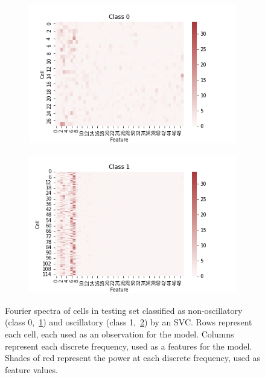 \begin{figure}
  \centering
  \begin{subfigure}[htpb]{0.7\textwidth}
   \centering
   \includegraphics[width=\textwidth]{fft_testing_featurevector_0}
   \caption{
   }
   \label{fig:analysis-svc-fft-0}
  \end{subfigure}

  \begin{subfigure}[htpb]{0.7\textwidth}
   \centering
   \includegraphics[width=\textwidth]{fft_testing_featurevector_1}
   \caption{
   }
   \label{fig:analysis-svc-fft-1}
  \end{subfigure}
  \caption{
    Fourier spectra of cells in testing set classified as non-oscillatory (class 0,~\ref{fig:analysis-svc-fft-0}) and oscillatory (class 1,~\ref{fig:analysis-svc-fft-1}) by an SVC.
    Rows represent each cell, each used as an observation for the model.
    Columns represent each discrete frequency, used as a features for the model.
    Shades of red represent the power at each discrete frequency, used as feature values.
  }
  \label{fig:analysis-svc-fft}
\end{figure}

